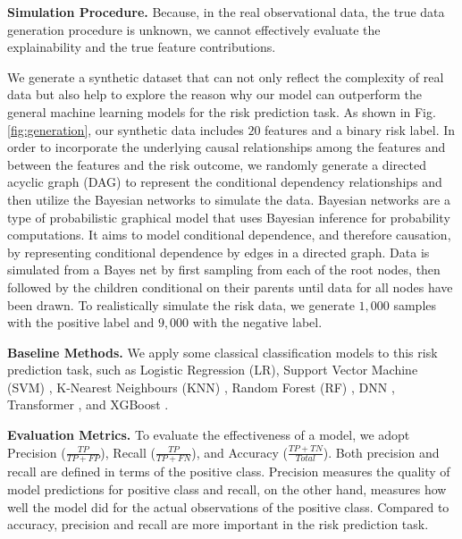 \documentclass[letterpaper]{article} %
\theoremstyle{definition}
\theoremstyle{remark}
\begin{document}
\noindent\textbf{Simulation Procedure.} 
Because, in the real observational data, the true data generation procedure is unknown, we cannot effectively evaluate the explainability and the true feature contributions.

We generate a synthetic dataset that can not only reflect the complexity of real data but also help to explore the reason why our model can outperform the general machine learning models for the risk prediction task. As shown in Fig. \ref{fig:generation}, our synthetic data includes $20$ features and a binary risk label. In order to incorporate the underlying causal relationships among the features and between the features and the risk outcome, we randomly generate a directed acyclic graph (DAG) to represent the conditional dependency relationships and then utilize the Bayesian networks \cite{heckerman2008tutorial} to simulate the data. Bayesian networks are a type of probabilistic graphical model that uses Bayesian inference for probability computations. It aims to model conditional dependence, and therefore causation, by representing conditional dependence by edges in a directed graph. Data is simulated from a Bayes net by first sampling from each of the root nodes, then followed by the children conditional on their parents until data for all nodes have been drawn. To realistically simulate the risk data, we generate $1,000$ samples with the positive label and $9,000$ with the negative label.


\noindent\textbf{Baseline Methods.} We apply some classical classification models to this risk prediction task, such as Logistic Regression (LR), Support Vector Machine (SVM) \cite{suykens1999least}, K-Nearest Neighbours (KNN) \cite{cunningham2021k}, Random Forest (RF) \cite{breiman2001random}, DNN \cite{larochelle2009exploring}, Transformer \cite{vaswani2017attention}, and XGBoost \cite{chen2016xgboost}.



\noindent\textbf{Evaluation Metrics.}
To evaluate the effectiveness of a model, we adopt Precision ($\frac{TP}{TP+FP}$), Recall ($\frac{TP}{TP+FN}$), and Accuracy ($\frac{TP+TN}{Total}$). Both precision and recall are defined in terms of the positive class. Precision measures the quality of model predictions for positive class and recall, on the other hand, measures how well the model did for the actual observations of the positive class. Compared to accuracy, precision and recall are more important in the risk prediction task.
\end{document}
